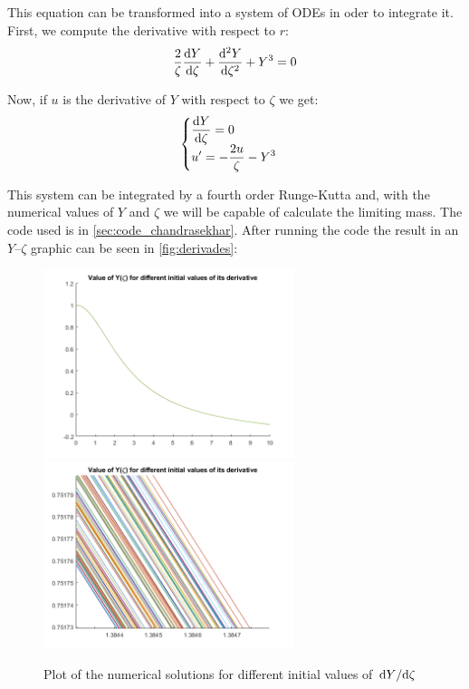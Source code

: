 \documentclass[a4paper]{article}
\begin{document}
This equation can be transformed into a system of ODEs in oder to integrate it. First, we compute the derivative with respect to $r$:
\begin{equation}
    \frac{2}{\zeta}\odv{Y}{\zeta}+\odv[order=2]{Y}{\zeta}+Y^3=0
\end{equation}

Now, if $u$ is the derivative of $Y$ with respect to $\zeta$ we get:
\begin{equation}
    \begin{cases}
        \displaystyle \odv{Y}{\zeta}=0\\
        \displaystyle u'=-\frac{2u}{\zeta}-Y^3
    \end{cases}
\end{equation}

This system can be integrated by a fourth order Runge-Kutta and, with the numerical values of $Y$ and $\zeta$ we will be capable of calculate the limiting mass. The code used is in \autoref{sec:code_chandrasekhar}. After running the code the result in an $Y$--$\zeta$ graphic can be seen in \autoref{fig:derivades}:
\begin{figure}[h]
    \includegraphics[width=7.3cm]{images/derivades_Y_lluny.png}
    \includegraphics[width=7.3cm]{images/derivades_Y.png}
    \centering
    \caption{Plot of the numerical solutions for different initial values of $\odv{Y}/{\zeta}$}
    \label{fig:derivades}
\end{figure}
\end{document}
